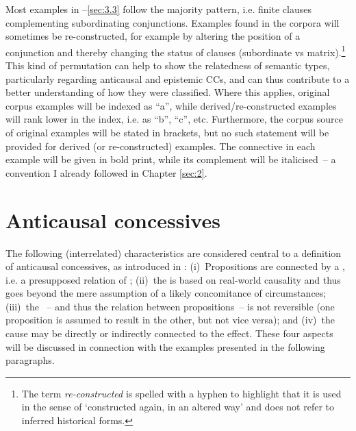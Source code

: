 \begin{sloppypar}
Most examples in –\ref{sec:3.3} follow the majority pattern, i.e. finite clauses complementing subordinating conjunctions. Examples found in the corpora will sometimes be re-constructed, for example by altering the position of a conjunction and thereby changing the status of clauses (subordinate vs matrix).\footnote{The term \textit{re-constructed} is spelled with a hyphen to highlight that it is used in the sense of ‘constructed again, in an altered way’ and does not refer to inferred historical forms.} This kind of permutation can help to show the relatedness of semantic types, particularly regarding anticausal and epistemic CCs, and can thus contribute to a better understanding of how they were classified. Where this applies, original corpus examples will be indexed as “a”, while derived/re-constructed examples will rank lower in the index, i.e. as “b”, “c”, etc. Furthermore, the corpus source of original examples will be stated in brackets, but no such statement will be provided for derived (or re-constructed) examples. The connective in each example will be given in bold print, while its complement will be italicised~– a convention I already followed in Chapter \ref{sec:2}.
\end{sloppypar}

\section{\label{bkm:Ref487180766}Anticausal concessives}\label{sec:3.1}

The following (interrelated) characteristics are considered central to a definition of anticausal concessives, as introduced in :
(i)~Propositions are connected by a , i.e. a presupposed relation of ;
(ii)~the  is based on real-world causality and thus goes beyond the mere assumption of a likely concomitance of circumstances;
(iii)~the ~– and thus the relation between propositions~– is not reversible (one proposition is assumed to result in the other, but not vice versa); and
(iv)~the cause may be directly or indirectly connected to the effect. These four aspects will be discussed in connection with the examples presented in the following paragraphs.

